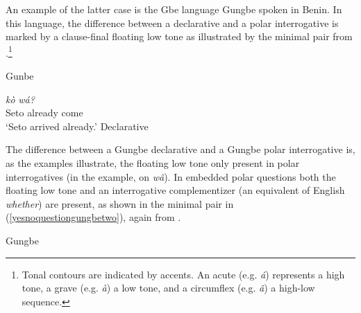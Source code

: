 An example of the latter case is the Gbe language Gungbe\label{gungbepolar} spoken in Benin. In this language, the difference between a declarative and a polar interrogative is marked by a clause-final floating low tone as illustrated by the minimal pair from \citet[93]{aboh2010sa}.\footnote{ Tonal contours are indicated by accents. An acute (e.g. \textit{á}) represents a high tone, a grave (e.g. \textit{à}) a low tone, and a circumflex (e.g. \textit{\^{a}}) a high-low sequence.}

\begin{exe}
\ex Gunbe\label{yesnoquestiongungbe}
\begin{xlist}
\ex {} {\textit{kò}} {\textit{wá?}} \\
{Seto} {already} {come}\\
\trans `Seto arrived already.' \label{yesnoquestiongungbea} \hfill Declarative
\end{xlist}
\end{exe}

\noindent The difference between a Gungbe declarative and a Gungbe polar interrogative is, as the examples illustrate, the floating low tone only present in polar interrogatives (in the example, on \textit{w\^{a}}). In embedded polar questions both the floating low tone and an interrogative complementizer (an equivalent of English \textit{whether}) are present, as shown in the minimal pair in (\ref{yesnoquestiongungbetwo}), again from \citet[93]{aboh2010sa}.

\begin{exe}
\ex Gungbe\label{yesnoquestiongungbetwo}\begin{xlist}
\end{xlist}
\end{exe}

